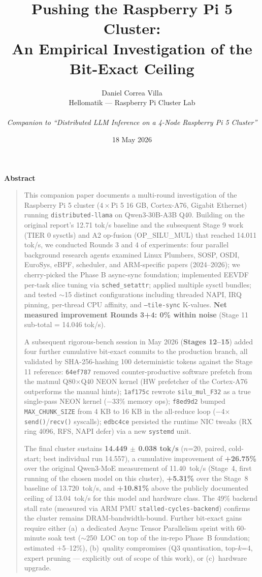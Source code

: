 \documentclass[10pt,a4paper]{article}
\title{Pushing the Raspberry Pi 5 Cluster:\\[0.15cm]
       An Empirical Investigation of the Bit-Exact Ceiling}
\author{Daniel Correa Villa\\
  \small Hellomatik --- Raspberry Pi Cluster Lab\\
  \small \texttt{}\\[2pt]
  \small \emph{Companion to ``Distributed LLM Inference on a 4-Node Raspberry Pi 5 Cluster''}}
\date{18 May 2026}
\renewenvironment{abstract}{%
  \vspace{6pt}\begin{center}\normalsize\bfseries Abstract\end{center}%
  \begin{quote}\noindent\small%
}{%
  \end{quote}\vspace{6pt}%
}
\begin{document}
\maketitle
\thispagestyle{empty}

\begin{abstract}
This companion paper documents a multi-round investigation of the Raspberry Pi 5 cluster ($4\times$Pi 5 16 GB, Cortex-A76, Gigabit Ethernet) running \texttt{distributed-llama} on Qwen3-30B-A3B Q40. Building on the original report's 12.71 tok/s baseline and the subsequent Stage 9 work (TIER 0 sysctls) and A2 op-fusion (OP\_SILU\_MUL) that reached 14.011 tok/s, we conducted Rounds 3 and 4 of experiments: four parallel background research agents examined Linux Plumbers, SOSP, OSDI, EuroSys, eBPF, scheduler, and ARM-specific papers (2024--2026); we cherry-picked the Phase B async-sync foundation; implemented EEVDF per-task slice tuning via \texttt{sched\_setattr}; applied multiple sysctl bundles; and tested $\sim$15 distinct configurations including threaded NAPI, IRQ pinning, per-thread CPU affinity, and \texttt{--tile-sync} K-values. \textbf{Net measured improvement Rounds 3+4: 0\% within noise} (Stage 11 sub-total = 14.046 tok/s).

A subsequent rigorous-bench session in May 2026 (\textbf{Stages 12--15}) added four further cumulative bit-exact commits to the production branch, all validated by SHA-256-hashing 100 deterministic tokens against the Stage 11 reference: \texttt{64ef787} removed counter-productive software prefetch from the matmul Q80$\times$Q40 NEON kernel (HW prefetcher of the Cortex-A76 outperforms the manual hints); \texttt{1af175c} rewrote \texttt{silu\_mul\_F32} as a true single-pass NEON kernel ($-$33\% memory ops); \texttt{f8ed9d2} bumped \texttt{MAX\_CHUNK\_SIZE} from 4 KB to 16 KB in the all-reduce loop ($-$4$\times$ \texttt{send()}/\texttt{recv()} syscalls); \texttt{edbc4ce} persisted the runtime NIC tweaks (RX ring 4096, RFS, NAPI defer) via a new \texttt{systemd} unit.

The final cluster sustains \textbf{14.449 $\pm$ 0.038 tok/s} ($n$=20, paired, cold-start; best individual run 14.557), a cumulative improvement of \textbf{+26.75\%} over the original Qwen3-MoE measurement of 11.40~tok/s (Stage~4, first running of the chosen model on this cluster), \textbf{+5.31\%} over the Stage~8 baseline of 13.720~tok/s, and \textbf{+10.81\%} above the publicly documented ceiling of 13.04~tok/s for this model and hardware class. The 49\% backend stall rate (measured via ARM PMU \texttt{stalled-cycles-backend}) confirms the cluster remains DRAM-bandwidth-bound. Further bit-exact gains require either (a)~a dedicated Async Tensor Parallelism sprint with 60-minute soak test ($\sim$250~LOC on top of the in-repo Phase~B foundation; estimated $+$5--12\%), (b)~quality compromises (Q3 quantisation, top-$k$=4, expert pruning --- explicitly out of scope of this work), or (c)~hardware upgrade.
\end{abstract}
\end{document}
